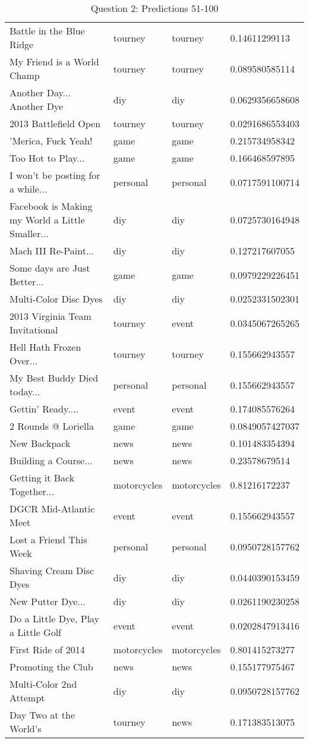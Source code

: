 \begin{table}[h!]
\begin{tabular}{| l | l | l | l |}
Battle in the Blue Ridge & tourney & tourney & 0.14611299113 \\
My Friend is a World Champ & tourney & tourney & 0.089580585114 \\
Another Day... Another Dye & diy & diy & 0.0629356658608 \\
2013 Battlefield Open & tourney & tourney & 0.0291686553403 \\
'Merica, Fuck Yeah! & game & game & 0.215734958342 \\
Too Hot to Play... & game & game & 0.166468597895 \\
I won't be posting for a while... & personal & personal & 0.0717591100714 \\
Facebook is Making my World a Little Smaller... & diy & diy & 0.0725730164948 \\
Mach III Re-Paint... & diy & diy & 0.127217607055 \\
Some days are Just Better... & game & game & 0.0979229226451 \\
Multi-Color Disc Dyes & diy & diy & 0.0252331502301 \\
2013 Virginia Team Invitational & tourney & event & 0.0345067265265 \\
Hell Hath Frozen Over... & tourney & tourney & 0.155662943557 \\
My Best Buddy Died today... & personal & personal & 0.155662943557 \\
Gettin' Ready.... & event & event & 0.174085576264 \\
2 Rounds @ Loriella & game & game & 0.0849057427037 \\
New Backpack & news & news & 0.101483354394 \\
Building a Course... & news & news & 0.23578679514 \\
Getting it Back Together... & motorcycles & motorcycles & 0.81216172237 \\
DGCR Mid-Atlantic Meet & event & event & 0.155662943557 \\
Lost a Friend This Week & personal & personal & 0.0950728157762 \\
Shaving Cream Disc Dyes & diy & diy & 0.0440390153459 \\
New Putter Dye... & diy & diy & 0.0261190230258 \\
Do a Little Dye, Play a Little Golf & event & event & 0.0202847913416 \\
First Ride of 2014 & motorcycles & motorcycles & 0.801415273277 \\
Promoting the Club & news & news & 0.155177975467 \\
Multi-Color 2nd Attempt & diy & diy & 0.0950728157762 \\
Day Two at the World's & tourney & news & 0.171383513075 \\
\hline
\end{tabular}
\caption{Question 2: Predictions 51-100}
\label{tab:two}
\end{table}

\clearpage